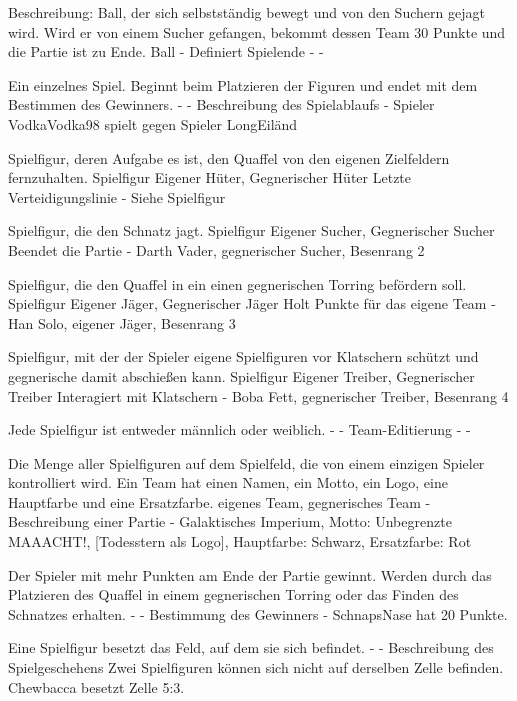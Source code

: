 {Beschreibung: Ball, der sich selbstständig bewegt und von den Suchern gejagt wird. Wird er von einem Sucher gefangen, bekommt dessen Team 30 Punkte und die Partie ist zu Ende.}
{Ball}
{-}
{Definiert Spielende}
{-}
{-}

{Ein einzelnes Spiel. Beginnt beim Platzieren der Figuren und endet mit dem Bestimmen des Gewinners.}
{-}
{-}
{Beschreibung des Spielablaufs}
{-}
{Spieler VodkaVodka98 spielt gegen Spieler LongEiländ}

{Spielfigur, deren Aufgabe es ist, den Quaffel von den eigenen Zielfeldern fernzuhalten.}
{Spielfigur}
{Eigener Hüter, Gegnerischer Hüter}
{Letzte Verteidigungslinie}
{-}
{Siehe \glqq{}Spielfigur\grqq{} }

{Spielfigur, die den Schnatz jagt.}
{Spielfigur}
{Eigener Sucher, Gegnerischer Sucher}
{Beendet die Partie}
{-}
{Darth Vader, gegnerischer Sucher, Besenrang 2}

{Spielfigur, die den Quaffel in ein einen gegnerischen Torring befördern soll.}
{Spielfigur}
{Eigener Jäger, Gegnerischer Jäger}
{Holt Punkte für das eigene Team}
{-}
{Han Solo, eigener Jäger, Besenrang 3}

{Spielfigur, mit der der Spieler eigene Spielfiguren vor Klatschern schützt und gegnerische damit abschießen kann.}
{Spielfigur}
{Eigener Treiber, Gegnerischer Treiber}
{Interagiert mit Klatschern}
{-}
{Boba Fett, gegnerischer Treiber, Besenrang 4}

{Jede Spielfigur ist entweder männlich oder weiblich.}
{-}
{-}
{Team-Editierung}
{-}
{-}

{Die Menge aller Spielfiguren auf dem Spielfeld, die von einem einzigen Spieler kontrolliert wird. Ein Team hat einen Namen, ein Motto, ein Logo, eine Hauptfarbe und eine Ersatzfarbe.}
{eigenes Team, gegnerisches Team}
{-}
{Beschreibung einer Partie}
{-}
{Galaktisches Imperium, Motto: \glqq{}Unbegrenzte MAAACHT!\grqq{}, [Todesstern als Logo], Hauptfarbe: Schwarz, Ersatzfarbe: Rot}

{Der Spieler mit mehr Punkten am Ende der Partie gewinnt. Werden durch das Platzieren des Quaffel in einem gegnerischen Torring oder das Finden des Schnatzes erhalten.}
{-}
{-}
{Bestimmung des Gewinners}
{-}
{SchnapsNase hat 20 Punkte.}

{Eine Spielfigur besetzt das Feld, auf dem sie sich befindet.}
{-}
{-}
{Beschreibung des Spielgeschehens}
{Zwei Spielfiguren können sich nicht auf derselben Zelle befinden.}
{Chewbacca besetzt Zelle 5:3.}

